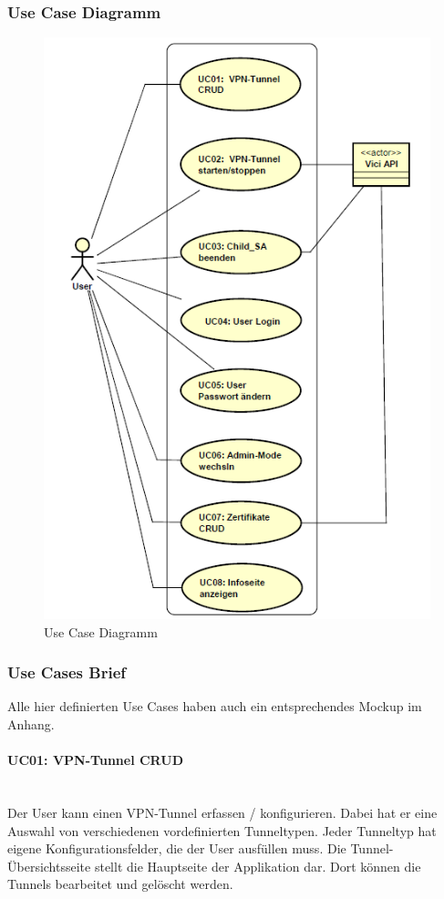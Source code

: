\subsubsection{Use Case Diagramm}
\begin{figure}[H]
\centering
\includegraphics[width=350pt]{images/strongMan_usecase.png}
\caption[Use Case Diagramm]{Use Case Diagramm}
\end{figure}


\subsubsection{Use Cases Brief}
Alle hier definierten Use Cases haben auch ein entsprechendes Mockup im Anhang.
\paragraph{UC01: VPN-Tunnel CRUD}\mbox{} \\
Der User kann einen VPN-Tunnel erfassen / konfigurieren. Dabei hat er eine Auswahl von verschiedenen vordefinierten Tunneltypen. Jeder Tunneltyp hat eigene Konfigurationsfelder, die der User ausfüllen muss. Die Tunnel-Übersichtsseite stellt die Hauptseite der Applikation dar. Dort können die Tunnels bearbeitet und gelöscht werden.

